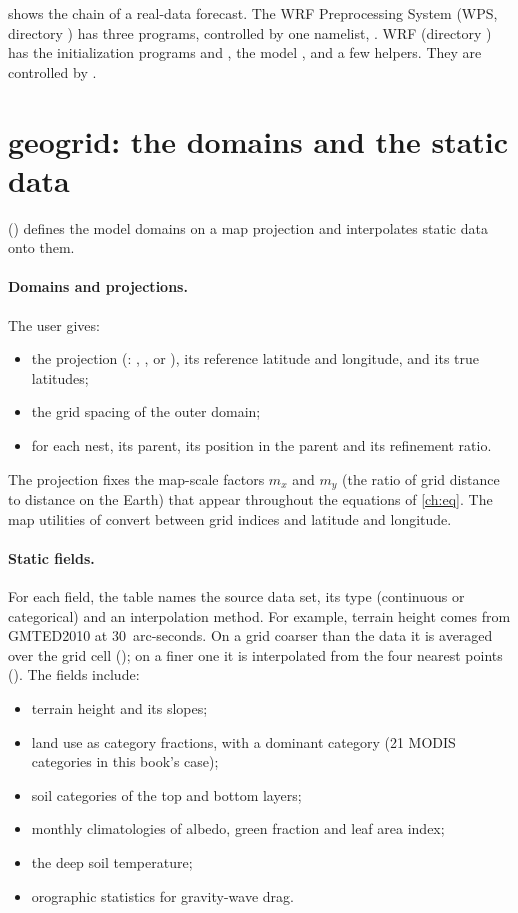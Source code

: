  shows the chain of a real-data forecast. The WRF Preprocessing System (WPS, directory )
has three programs, controlled by one namelist, . WRF (directory ) has the
initialization programs  and , the model , and a few helpers. They are
controlled by .

\section{geogrid: the domains and the static data}

 () defines the model domains on a map projection and
interpolates static data onto them.

\paragraph{Domains and projections.} The user gives:
\begin{itemize}
  \item the projection (: , ,  or ), its
    reference latitude and longitude, and its true latitudes;
  \item the grid spacing of the outer domain;
  \item for each nest, its parent, its position in the parent and its refinement ratio.
\end{itemize}
The projection fixes the map-scale factors $m_x$ and $m_y$ (the ratio of grid distance to distance on the Earth)
that appear throughout the equations of \cref{ch:eq}. The map utilities of  convert between
grid indices and latitude and longitude.

\paragraph{Static fields.} For each field, the table  names the source data set, its type
(continuous or categorical) and an interpolation method. For example, terrain height comes from GMTED2010 at
30~arc-seconds. On a grid coarser than the data it is averaged over the grid cell (); on a finer
one it is interpolated from the four nearest points (). The fields include:
\begin{itemize}
  \item terrain height and its slopes;
  \item land use as category fractions, with a dominant category (21 MODIS categories in this book's case);
  \item soil categories of the top and bottom layers;
  \item monthly climatologies of albedo, green fraction and leaf area index;
  \item the deep soil temperature;
  \item orographic statistics for gravity-wave drag.
\end{itemize}


